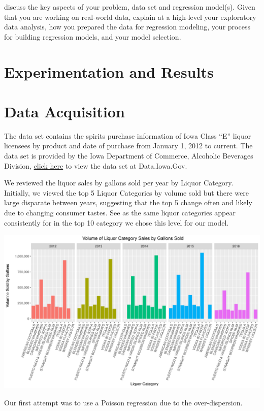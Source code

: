 \documentclass[]{elsarticle} %
\makeatletter
\def\maxwidth{\ifdim\Gin@nat@width>\linewidth\linewidth
\else\Gin@nat@width\fi}
\let\Oldincludegraphics\includegraphics
\renewcommand{\includegraphics}[1]{\Oldincludegraphics[width=\maxwidth]{#1}}
\makeatother
\begin{document}
discuss the key aspects of your problem, data set and regression
model(s). Given that you are working on real-world data, explain at a
high-level your exploratory data analysis, how you prepared the data for
regression modeling, your process for building regression models, and
your model selection.

\section{Experimentation and Results}\label{experimentation-and-results}

\section{Data Acquisition}\label{data-acquisition}

The data set contains the spirits purchase information of Iowa Class
``E'' liquor licensees by product and date of purchase from January 1,
2012 to current. The data set is provided by the Iowa Department of
Commerce, Alcoholic Beverages Division,
\href{https://data.iowa.gov/Economy/Iowa-Liquor-Sales/m3tr-qhgy}{click
here} to view the data set at Data.Iowa.Gov.

We reviewed the liquor sales by gallons sold per year by Liquor
Category. Initially, we viewed the top 5 Liquor Categories by volume
sold but there were large disparate between years, suggesting that the
top 5 change often and likely due to changing consumer tastes. See as
the same liquor categories appear consistently for in the top 10
category we chose this level for our model.

\includegraphics{Final_Project_files/figure-latex/unnamed-chunk-5-1.pdf}

Our first attempt was to use a Poisson regression due to the
over-dispersion.
\end{document}
